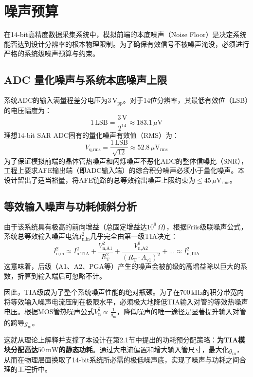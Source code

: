 \section{噪声预算}
在14-bit高精度数据采集系统中，模拟前端的本底噪声（Noise Floor）是决定系统能否达到设计分辨率的根本物理限制。为了确保有效信号不被噪声淹没，必须进行严格的系统级噪声预算与约束。

\subsection{ADC 量化噪声与系统本底噪声上限}
系统ADC的输入满量程差分电压为$3\,\text{V}_{\text{pp}}$。对于14位分辨率，其最低有效位（LSB）的电压幅度为：
\begin{equation}
    1\,\text{LSB} = \frac{3\,\text{V}}{2^{14}} \approx 183.1\,\mu\text{V}
\end{equation}
理想14-bit SAR ADC固有的量化噪声有效值（RMS）为：
\begin{equation}
    V_{\text{q,rms}} = \frac{1\,\text{LSB}}{\sqrt{12}} \approx 52.8\,\mu\text{V}_{\text{rms}}
\end{equation}
为了保证模拟前端的晶体管热噪声和闪烁噪声不恶化ADC的整体信噪比（SNR），工程上要求AFE输出端（即ADC输入端）的综合积分噪声必须小于量化噪声。本设计留出了适当裕量，将AFE链路的总等效输出噪声上限约束为$\le 45\,\mu\text{V}_{\text{rms}}$。

\subsection{等效输入噪声与功耗倾斜分析}
由于该系统具有极高的前向增益（总固定增益达$10^9\,\Omega$），根据Friis级联噪声公式，系统总等效输入噪声电流$I_{\text{n,in}}^2$几乎完全由第一级TIA决定：
\begin{equation}
    I_{\text{n,in}}^2 \approx I_{\text{n,TIA}}^2 + \frac{V_{\text{n,A1}}^2}{R_{\text{T}}^2} + \frac{V_{\text{n,A2}}^2}{(R_{\text{T}} \cdot A_{\text{v1}})^2} + \dots \approx I_{\text{n,TIA}}^2
\end{equation}
这意味着，后级（A1、A2、PGA等）产生的噪声会被前级的高增益除以巨大的系数，折算到输入端后可忽略不计。

因此，TIA级成为了整个系统噪声性能的绝对瓶颈。为了在$700\,\text{kHz}$的积分带宽内将等效输入噪声电流压制在极限水平，必须极大地降低TIA输入对管的等效热噪声电压。根据MOS管热噪声公式$V_{\text{n}}^2 \propto \frac{1}{g_{\text{m}}}$，降低噪声的唯一途径是显著提升输入对管的跨导$g_{\text{m}}$。

这就从理论上解释并支撑了本设计在第2.1节中提出的功耗预分配策略：\textbf{为TIA模块分配高达$50\,\text{mW}$的静态功耗}。通过大电流偏置和增大输入管尺寸，最大化$g_{\text{m}}$，从而在物理层面换取了14-bit系统所必需的极低噪声底，实现了噪声与功耗之间合理的工程折中。